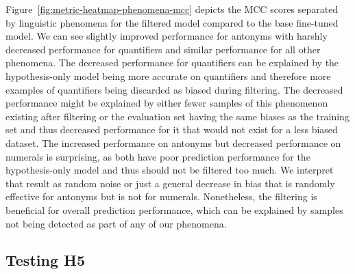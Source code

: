 Figure~\ref{fig:metric-heatmap-phenomena-mcc} depicts the \ac{MCC} scores separated by linguistic phenomena for the filtered model compared to the base fine-tuned model. We can see slightly improved performance for antonyms with harshly decreased performance for quantifiers and similar performance for all other phenomena. The decreased performance for quantifiers can be explained by the hypothesis-only model being more accurate on quantifiers and therefore more examples of quantifiers being discarded as biased during filtering. The decreased performance might be explained by either fewer samples of this phenomenon existing after filtering or the evaluation set having the same biases as the training set and thus decreased performance for it that would not exist for a less biased dataset. The increased performance on antonyms but decreased performance on numerals is surprising, as both have poor prediction performance for the hypothesis-only model and thus should not be filtered too much. We interpret that result as random noise or just a general decrease in bias that is randomly effective for antonyms but is not for numerals. Nonetheless, the filtering is beneficial for overall prediction performance, which can be explained by samples not being detected as part of any of our phenomena.


\subsection{Testing H5}
